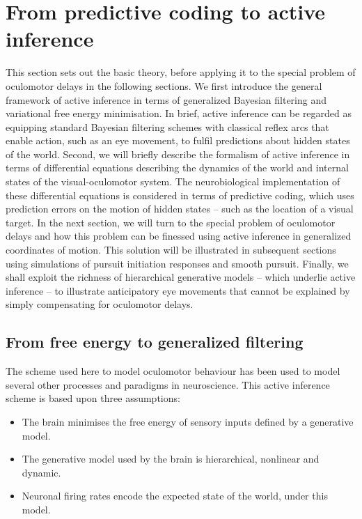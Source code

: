 \documentclass[a4paper]{article} %
\begin{document}
\section{From predictive coding to active inference}
\label{sec:active-inference}
This section sets out the basic theory, before applying it to the
special problem of oculomotor delays in the following sections. We first
introduce the general framework of active inference in terms of
generalized Bayesian filtering and variational free energy minimisation.
In brief, active inference can be regarded as equipping standard
Bayesian filtering schemes with classical reflex arcs that enable action, such as an eye movement, %
to fulfil predictions about hidden states of the world. Second, we will
briefly describe the formalism of active inference in terms of
differential equations describing the dynamics of the world and internal
states of the visual-oculomotor system. The neurobiological
implementation of these differential equations is considered in terms of
predictive coding, which uses prediction errors on the motion of hidden
states -- such as the location of a visual target. In the next section,
we will turn to the special problem of oculomotor delays and how this
problem can be finessed using active inference in generalized
coordinates of motion. This solution will be illustrated in subsequent
sections using simulations of pursuit initiation responses and smooth
pursuit. Finally, we shall exploit the richness of hierarchical
generative models -- which underlie active inference -- to illustrate
anticipatory eye movements that cannot be explained by simply
compensating for oculomotor delays.

\subsection{From free energy to generalized filtering}

The scheme used here to model oculomotor behaviour has been used to
model several other processes and paradigms in neuroscience. This active inference scheme is based upon three assumptions: %

\begin{itemize}
\item
  The brain minimises the free energy of sensory inputs defined by a
  generative model.
\item
  The generative model used by the brain is hierarchical, nonlinear and
  dynamic.
\item
  Neuronal firing rates encode the expected state of the world, under
  this model.
\end{itemize}
\end{document}
